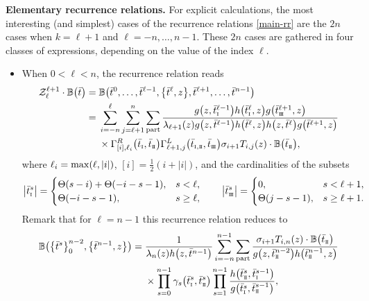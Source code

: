 \documentclass[pdftex]{sigma}
\newcommand{\so}{\scriptscriptstyle \rm I}
\newcommand{\st}{\scriptscriptstyle \rm I\hspace{-1pt}I}
\newcommand{\sth}{\scriptscriptstyle \rm I\hspace{-1pt}I\hspace{-1pt}I}
\newcommand{\bt}{{\bar t}}
\theoremstyle{definition}
\def\BB{{\mathbb{B}}}
\def\r#1{\eqref{#1}}
\def\Z{\mathcal{Z}}
\def\Gml{\Gamma^L}
\def\Gmr{\Gamma^R}
\begin{document}
{\bf Elementary recurrence relations.}
For explicit calculations, the most interesting (and simplest) cases of the recurrence
relations \r{main-rr} are the $2n$ cases when $k=\ell+1$ and $\ell=-n,\dots,n-1$.
These $2n$ cases are gathered in four classes of expressions, depending on the value of the index $\ell$.
\begin{itemize}\itemsep=0pt
\item When $0<\ell<n$, the recurrence relation reads
\begin{align*}%
\begin{split}
\Z^{\ell+1}_{\ell}\cdot\BB\bigl(\bt\bigr)={}&
\BB\bigl(\bt^0,\dots,\bt^{\ell-1},\bigl\{\bt^\ell,z\bigr\},\bt^{\ell+1},\dots,\bt^{n-1}\bigr)\\
={}&\sum_{i=-n}^{\ell}\sum_{j=\ell+1}^n\sum_{\rm part}
\frac{g\bigl(z,\bt^{\ell-1}_{\so}\bigr) h\bigl(\bt^{\ell}_{\so},z\bigr) g\bigl(\bt^{\ell+1}_{\sth},z\bigr)}
{\lambda_{\ell+1}(z) g\bigl(z,\bt^{\ell-1}\bigr) h\bigl(\bt^{\ell},z\bigr)
h\bigl(z,\bt^{\ell}\bigr) g\bigl(\bt^{\ell+1},z\bigr)}\\
&\times \Gmr_{[i],\ell_i}\bigl(\bt_{\so},\bt_{{\st}}\bigr)
\Gml_{\ell+1,j}\bigl(\bt_{{\so},{\st}},\bt_{{\sth}}\bigr) \sigma_{i+1}
T_{i,j}(z)\cdot \BB\bigl(\bt_{\st}\bigr) ,
\end{split}
\end{align*}
where $\ell_i={\rm max}(\ell,|i|)$, $[i]=\frac12(i+|i|)$, and the cardinalities of the subsets
\[%
\big|\bt^s_{\so}\big|=\begin{cases}
\Theta(s-i)+\Theta(-i-s-1), &s<\ell,\\
\Theta(-i-s-1), &s\geq \ell,
\end{cases}\qquad
\big|\bt^s_{\sth}\big|=\begin{cases}
0, &s<\ell+1,\\
\Theta(j-s-1), &s\geq \ell+1.
\end{cases}
\]
Remark that for $\ell=n-1$ this recurrence relation reduces to
\begin{align*}
\BB\bigl(\bigl\{\bt^s\bigr\}_{0}^{n-2},\bigl\{\bt^{n-1},z\bigr\}\bigr)={}&\frac{1}{\lambda_n(z) h\bigl(z,\bt^{n-1}\bigr)}\sum_{i=-n}^{n-1}\sum_{\rm part}
\frac{\sigma_{i+1} T_{i,n}(z)\cdot
\BB\bigl(\bt_{\st}\bigr)}{g\bigl(z,\bt^{n-2}_{\st}\bigr) h\bigl(\bt^{n-1}_{\st},z\bigr)}\\
&\times
\prod_{s=0}^{n-1}\gamma_s\bigl(\bt^s_{\so},\bt^s_{\st}\bigr)
\prod_{s=1}^{n-1}\frac{h\bigl(\bt^s_{\st},\bt^{s-1}_{\so}\bigr)}{g\bigl(\bt^s_{\so},\bt^{s-1}_{\st}\bigr)},
\end{align*}

\end{itemize}
\end{document}
